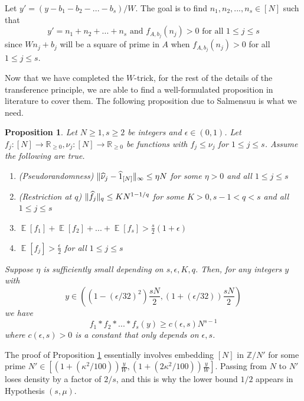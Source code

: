 \documentclass[11pt]{amsart}
\theoremstyle{plain} %
\newtheorem{prop}[thm]{Proposition}
\theoremstyle{remark}
\numberwithin{equation}{section}
\newcommand{\R}{\mathbb{R}}
\newcommand{\E}{\mathop{\mathbb{E}}}
\newcommand{\Z}{\mathbb{Z}}
\DeclarePairedDelimiter\norm{\lVert}{\rVert}
\begin{document}
Let $y'=(y-b_1-b_2-...-b_s)/W$. The goal is to find $n_1,n_2,...,n_s\in [N]$ such that
\begin{equation*}
    \text{$y'=n_1+n_2+...+n_s$ and $f_{A,b_j}(n_j)>0$ for all $1\leq j\leq s$}
\end{equation*}
since $Wn_j+b_j$ will be a square of prime in $A$ when $f_{A,b_j}(n_j)>0$ for all $1\leq j\leq s$.

Now that we have completed the $W$-trick, for the rest of the details of the transference principle, we are able to find a well-formulated proposition in literature to cover them. The following proposition due to Salmensuu \cite[Proposition 3.9]{Salmensuu} is what we need.

\begin{prop}\label{transference lemma}
    Let $N\geq 1, s\geq 2$ be integers and $\epsilon\in (0,1)$. Let $f_j:[N]\longrightarrow\R_{\geq 0}, \nu_j:[N]\longrightarrow\R_{\geq 0}$ be functions with $f_j\leq \nu_j$ for $1\leq j\leq s$. Assume the following are true.
    \begin{enumerate}
        \item (Pseudorandomness) $\norm{\widehat{\nu}_j-\widehat{1}_{[N]}}_{\infty}\leq \eta N$ for some $\eta>0$ and all $1\leq j\leq s$
        \item (Restriction at $q$) $\norm{\widehat{f}_j}_q\leq KN^{1-1/q}$ for some $K>0,s-1<q<s$ and all $1\leq j\leq s$
        \item $\E[f_1]+\E[f_2]+...+\E[f_s]>\frac{s}{2}(1+\epsilon)$
        \item $\E[f_j]>\frac{\epsilon}{2}$ for all $1\leq j\leq s$
    \end{enumerate}
    Suppose $\eta$ is sufficiently small depending on $s,\epsilon,K,q$. Then, for any integers $y$ with
    \begin{equation*}
        y\in \left((1-(\epsilon/32)^2)\frac{sN}{2}, (1+(\epsilon/32))\frac{sN}{2}\right)
    \end{equation*}
    we have
    \begin{equation*}
        f_1*f_2*...*f_s(y)\geq c(\epsilon,s)N^{s-1}
    \end{equation*}
    where $c(\epsilon,s)>0$ is a constant that only depends on $\epsilon,s$.
\end{prop}

The proof of Proposition \ref{transference lemma} essentially involves embedding $[N]$ in $\Z/N'$ for some prime $N'\in \left[(1+(\kappa^2/100))\frac{y}{W}, (1+(2\kappa^2/100))\frac{y}{W}\right]$. Passing from $N$ to $N'$ loses density by a factor of $2/s$, and this is why the lower bound $1/2$ appears in Hypothesis $(s,\mu)$.
\end{document}
